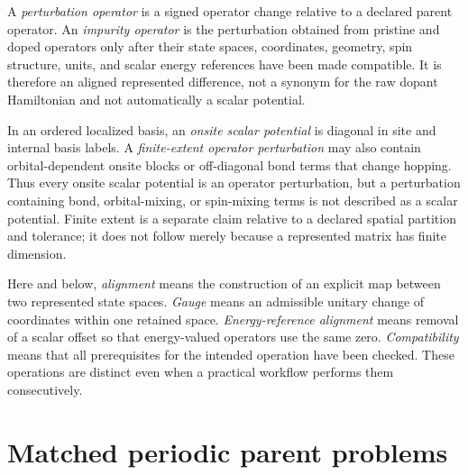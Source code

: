 \begin{definition}

A \emph{perturbation operator} is a signed operator change relative to a
declared parent operator. An \emph{impurity operator} is the perturbation
obtained from pristine and doped operators only after their state spaces,
coordinates, geometry, spin structure, units, and scalar energy references have
been made compatible. It is therefore an aligned represented difference, not a
synonym for the raw dopant Hamiltonian and not automatically a scalar
potential.
\end{definition}

\begin{definition}

In an ordered localized basis, an \emph{onsite scalar potential} is diagonal in
site and internal basis labels. A \emph{finite-extent operator perturbation} may
also contain orbital-dependent onsite blocks or off-diagonal bond terms that
change hopping. Thus every onsite scalar potential is an operator
perturbation, but a perturbation containing bond, orbital-mixing, or spin-mixing
terms is not described as a scalar potential. Finite extent is a separate claim
relative to a declared spatial partition and tolerance; it does not follow
merely because a represented matrix has finite dimension.
\end{definition}

Here and below, \emph{alignment} means the construction of an explicit map
between two represented state spaces. \emph{Gauge} means an admissible unitary
change of coordinates within one retained space. \emph{Energy-reference
alignment} means removal of a scalar offset so that energy-valued operators use
the same zero. \emph{Compatibility} means that all prerequisites for the
intended operation have been checked. These operations are distinct even when
a practical workflow performs them consecutively.

\section{Matched periodic parent problems}

